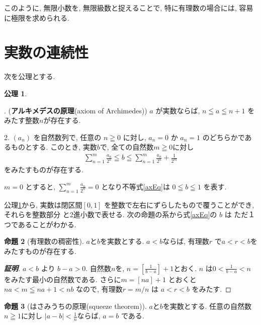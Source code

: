 \documentclass[11pt, a4paper, dvipdfmx]{jsarticle}
\theoremstyle{definition}
\newtheorem{Axiom}{公理}[section]
\newtheorem{Proposition}[Axiom]{命題}
\newcommand{\dip}{\displaystyle}
\numberwithin{equation}{section} %
\begin{document}
このように, 無限小数を, 無限級数と捉えることで, 
特に有理数の場合には, 容易に極限を求められる. 

\section{実数の連続性}

次を公理とする. 

\begin{Axiom}\label{Ax:RNum}
  
  . 
  ({\bf アルキメデスの原理}(axiom of Archimedes)) 
  $a$ が実数ならば, $n \leqq a \leqq n + 1$ 
  をみたす整数$n$が存在する. 
    
  2. 
  $(a_n)$ を自然数列で, 任意の $n \geqq 0$ に対し, 
  $a_n = 0$ か $a_n = 1$ のどちらかであるものとする. 
  このとき, 実数$b$で, 全ての自然数$m \geqq 0$に対し
  \begin{eqnarray}\label{axEq}
    \sum_{n=1}^{m}\frac{a_n}{2^n} 
    \leqq b 
    \leqq \sum_{n=1}^{m}\frac{a_n}{2^n} + \frac{1}{2^m}
  \end{eqnarray}
  をみたすものが存在する. 
\end{Axiom}

$m = 0$ とすると, 
$\dip \sum_{n=1}^{m}\frac{a_n}{2^n} = 0$
となり不等式\eqref{axEq}は
$0 \leqq b \leqq 1$
を表す. 

公理\ref{Ax:RNum}から, 実数は閉区間$\left[0,1\right]$
を整数で左右にずらしたもので覆うことができ, それらを整数部分
と2進小数で表せる. 次の命題の系から式\eqref{axEq}の $b$ は
ただ１つであることがわかる. 

\begin{Proposition}[有理数の稠密性]\label{Pr:dnsQ}
  $a$と$b$を実数とする. $a<b$ならば, 
  有理数$r$ で$a<r<b$をみたすものが存在する. 
\end{Proposition}

\begin{proof}[{\bf 証明}]
  $a<b$ より $b-a>0$. 自然数$n$を, 
  $\dip n = \left[\frac{1}{b-a}\right] + 1$とおく. 
  $n$ は$\dip 0 < \frac{1}{b-a} <n$
  をみたす最小の自然数である. さらに$m = [na]+1$ とおくと
  $na< m \leqq na+1 <nb$ なので, 有理数$r = m/n$ は
  $a < r < b$ をみたす. 
\end{proof}

\begin{Proposition}[はさみうちの原理(squeeze theorem)]\label{Pr:sq}
  $a$と$b$を実数とする. 任意の自然数$n\geqq1$に対し
  $\dip|a-b|<\frac{1}{n}$ならば, $a=b$ である. 
\end{Proposition}
\end{document}
